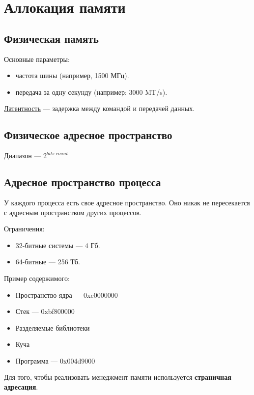 \section{Аллокация памяти}

\subsection{Физическая память}

Основные параметры:
\begin{itemize}
	\item частота шины (например, 1500 МГц).
	\item передача за одну секунду (например: 3000 MT/s).
\end{itemize}

\begin{Def}
	\underline{Латентность} --- задержка между командой и передачей данных.
\end{Def}

\subsection{Физическое адресное пространство}

Диапазон --- $2^{bits\_count}$

\subsection{Адресное пространство процесса}

У каждого процесса есть свое адресное пространство. Оно никак не пересекается
с адресным пространством других процессов.

Ограничения: 
\begin{itemize}
	\item 32-битные системы --- 4 Гб.
	\item 64-битные --- 256 Тб.
\end{itemize}

Пример содержимого:
\begin{itemize}
	\item Пространство ядра --- 0xc0000000
	\item Стек --- 0xbf800000
	\item Разделяемые библиотеки
	\item Куча
	\item Программа --- 0x004d9000
\end{itemize}

Для того, чтобы реализовать менеджмент памяти используется \textbf{страничная адресация}.


